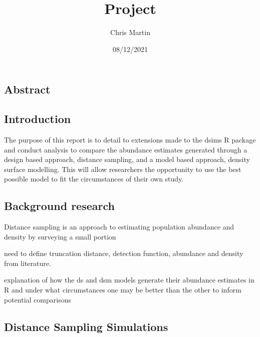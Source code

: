 \documentclass[
]{article}
\title{Project}
\author{Chris Martin}
\date{08/12/2021}
\begin{document}
\maketitle

\hypertarget{abstract}{%
\subsection{Abstract}\label{abstract}}

\hypertarget{introduction}{%
\subsection{Introduction}\label{introduction}}

The purpose of this report is to detail to extensions made to the dsims
R package and conduct analysis to compare the abundance estimates
generated through a design based approach, distance sampling, and a
model based approach, density surface modelling. This will allow
researchers the opportunity to use the best possible model to fit the
circumstances of their own study.

\hypertarget{background-research}{%
\subsection{Background research}\label{background-research}}

Distance sampling is an approach to estimating population abundance and
density by surveying a small portion

need to define truncation distance, detection function, abundance and
density from literature.

explanation of how the ds and dsm models generate their abundance
estimates in R and under what circumstances one may be better than the
other to inform potential comparisons

\hypertarget{distance-sampling-simulations}{%
\subsection{Distance Sampling
Simulations}\label{distance-sampling-simulations}}
\end{document}
